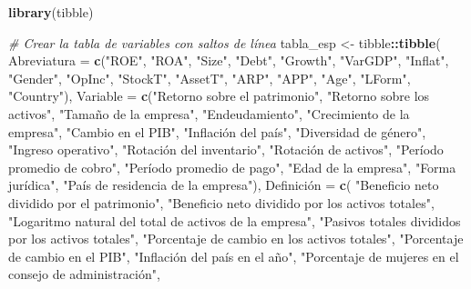 \documentclass[
]{article}
\newenvironment{Shaded}{\begin{snugshade}}{\end{snugshade}}
\newcommand{\AttributeTok}[1]{\textcolor[rgb]{0.13,0.29,0.53}{#1}}
\newcommand{\CommentTok}[1]{\textcolor[rgb]{0.56,0.35,0.01}{\textit{#1}}}
\newcommand{\FunctionTok}[1]{\textcolor[rgb]{0.13,0.29,0.53}{\textbf{#1}}}
\newcommand{\NormalTok}[1]{#1}
\newcommand{\OtherTok}[1]{\textcolor[rgb]{0.56,0.35,0.01}{#1}}
\newcommand{\SpecialCharTok}[1]{\textcolor[rgb]{0.81,0.36,0.00}{\textbf{#1}}}
\newcommand{\StringTok}[1]{\textcolor[rgb]{0.31,0.60,0.02}{#1}}
\begin{document}
\begin{Shaded}
\begin{Highlighting}[]
\FunctionTok{library}\NormalTok{(tibble)}

\CommentTok{\# Crear la tabla de variables con saltos de línea}
\NormalTok{tabla\_esp }\OtherTok{\textless{}{-}}\NormalTok{ tibble}\SpecialCharTok{::}\FunctionTok{tibble}\NormalTok{(}
  \AttributeTok{Abreviatura =} \FunctionTok{c}\NormalTok{(}\StringTok{"ROE"}\NormalTok{, }\StringTok{"ROA"}\NormalTok{, }\StringTok{"Size"}\NormalTok{, }\StringTok{"Debt"}\NormalTok{, }\StringTok{"Growth"}\NormalTok{, }\StringTok{"VarGDP"}\NormalTok{, }\StringTok{"Inflat"}\NormalTok{, }
                   \StringTok{"Gender"}\NormalTok{, }\StringTok{"OpInc"}\NormalTok{, }\StringTok{"StockT"}\NormalTok{, }\StringTok{"AssetT"}\NormalTok{, }\StringTok{"ARP"}\NormalTok{, }\StringTok{"APP"}\NormalTok{, }
                   \StringTok{"Age"}\NormalTok{, }\StringTok{"LForm"}\NormalTok{, }\StringTok{"Country"}\NormalTok{),}
  \AttributeTok{Variable =} \FunctionTok{c}\NormalTok{(}\StringTok{"Retorno sobre el patrimonio"}\NormalTok{, }\StringTok{"Retorno sobre los activos"}\NormalTok{,}
               \StringTok{"Tamaño de la empresa"}\NormalTok{, }\StringTok{"Endeudamiento"}\NormalTok{, }
               \StringTok{"Crecimiento de la empresa"}\NormalTok{, }\StringTok{"Cambio en el PIB"}\NormalTok{, }
               \StringTok{"Inflación del país"}\NormalTok{, }\StringTok{"Diversidad de género"}\NormalTok{,}
               \StringTok{"Ingreso operativo"}\NormalTok{, }\StringTok{"Rotación del inventario"}\NormalTok{,}
               \StringTok{"Rotación de activos"}\NormalTok{, }\StringTok{"Período promedio de cobro"}\NormalTok{,}
               \StringTok{"Período promedio de pago"}\NormalTok{, }\StringTok{"Edad de la empresa"}\NormalTok{,}
               \StringTok{"Forma jurídica"}\NormalTok{, }\StringTok{"País de residencia de la empresa"}\NormalTok{),}
\NormalTok{  Definición }\OtherTok{=} \FunctionTok{c}\NormalTok{(}
    \StringTok{"Beneficio neto dividido por el patrimonio"}\NormalTok{, }
    \StringTok{"Beneficio neto dividido por los activos totales"}\NormalTok{, }
    \StringTok{"Logaritmo natural del total de activos de la empresa"}\NormalTok{, }
    \StringTok{"Pasivos totales divididos por los activos totales"}\NormalTok{, }
    \StringTok{"Porcentaje de cambio en los activos totales"}\NormalTok{, }
    \StringTok{"Porcentaje de cambio en el PIB"}\NormalTok{, }
    \StringTok{"Inflación del país en el año"}\NormalTok{, }
    \StringTok{"Porcentaje de mujeres en el consejo de administración"}\NormalTok{, }

\end{Highlighting}
\end{Shaded}
\end{document}
